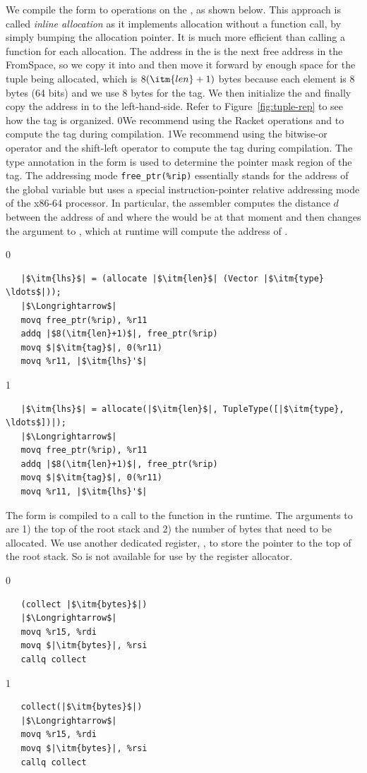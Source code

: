 \documentclass[7x10,nocrop]{TimesAPriori_MIT}%
\def\racketEd{0}
\def\pythonEd{1}
\def\edition{0}
\newcommand{\racket}[1]{{\if\edition\racketEd{#1}\fi}}
\newcommand{\python}[1]{{\if\edition\pythonEd #1\fi}}
\begin{document}
We compile the  form to operations on the
, as shown below. This approach is called \emph{inline
  allocation} as it implements allocation without a function call, by
simply bumping the allocation pointer. It is much more efficient than
calling a function for each allocation. The address in the
 is the next free address in the FromSpace, so we copy
it into  and then move it forward by enough space for the
tuple being allocated, which is $8(\itm{len}+1)$ bytes because each
element is 8 bytes (64 bits) and we use 8 bytes for the tag.  We then
initialize the  and finally copy the address in  to
the left-hand-side. Refer to Figure~\ref{fig:tuple-rep} to see how the
tag is organized.
%
\racket{We recommend using the Racket operations
\code{bitwise-ior} and \code{arithmetic-shift} to compute the tag
during compilation.}
%
\python{We recommend using the bitwise-or operator \code{|} and the
  shift-left operator \code{<<} to compute the tag during
  compilation.}
%
The type annotation in the  form is used to determine
the pointer mask region of the tag.
%
The addressing mode \verb!free_ptr(%rip)! essentially stands for the
address of the  global variable but uses a special
instruction-pointer relative addressing mode of the x86-64 processor.
In particular, the assembler computes the distance $d$ between the
address of  and where the  would be at that
moment and then changes the  argument to
, which at runtime will compute the address of
.
%
{\if\edition\racketEd
\begin{lstlisting}
   |$\itm{lhs}$| = (allocate |$\itm{len}$| (Vector |$\itm{type} \ldots$|));
   |$\Longrightarrow$|
   movq free_ptr(%rip), %r11
   addq |$8(\itm{len}+1)$|, free_ptr(%rip)
   movq $|$\itm{tag}$|, 0(%r11)
   movq %r11, |$\itm{lhs}'$|
\end{lstlisting}
\fi}
{\if\edition\pythonEd    
\begin{lstlisting}
   |$\itm{lhs}$| = allocate(|$\itm{len}$|, TupleType([|$\itm{type}, \ldots$])|);
   |$\Longrightarrow$|
   movq free_ptr(%rip), %r11
   addq |$8(\itm{len}+1)$|, free_ptr(%rip)
   movq $|$\itm{tag}$|, 0(%r11)
   movq %r11, |$\itm{lhs}'$|
\end{lstlisting}
\fi}
The  form is compiled to a call to the 
function in the runtime. The arguments to  are 1) the
top of the root stack and 2) the number of bytes that need to be
allocated.  We use another dedicated register, , to
store the pointer to the top of the root stack. So  is not
available for use by the register allocator.
{\if\edition\racketEd
\begin{lstlisting}
   (collect |$\itm{bytes}$|)
   |$\Longrightarrow$|
   movq %r15, %rdi
   movq $|\itm{bytes}|, %rsi
   callq collect
\end{lstlisting}
\fi}
{\if\edition\pythonEd    
\begin{lstlisting}
   collect(|$\itm{bytes}$|)
   |$\Longrightarrow$|
   movq %r15, %rdi
   movq $|\itm{bytes}|, %rsi
   callq collect
\end{lstlisting}
\fi}
\end{document}
